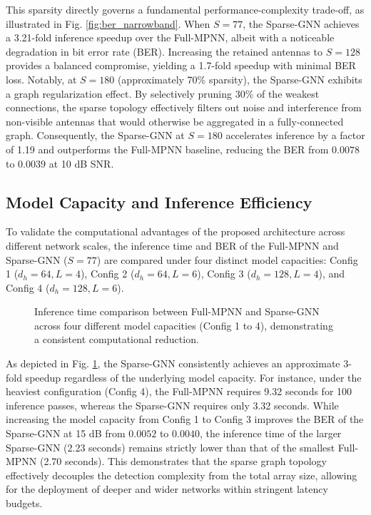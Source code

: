 This sparsity directly governs a fundamental performance-complexity trade-off, as illustrated in Fig. \ref{fig:ber_narrowband}. When $S=77$, the Sparse-GNN achieves a 3.21-fold inference speedup over the Full-MPNN, albeit with a noticeable degradation in bit error rate (BER). Increasing the retained antennas to $S=128$ provides a balanced compromise, yielding a 1.7-fold speedup with minimal BER loss. Notably, at $S=180$ (approximately 70\% sparsity), the Sparse-GNN exhibits a graph regularization effect. By selectively pruning 30\% of the weakest connections, the sparse topology effectively filters out noise and interference from non-visible antennas that would otherwise be aggregated in a fully-connected graph. Consequently, the Sparse-GNN at $S=180$ accelerates inference by a factor of 1.19 and outperforms the Full-MPNN baseline, reducing the BER from $0.0078$ to $0.0039$ at 10 dB SNR.

\subsection{Model Capacity and Inference Efficiency}
To validate the computational advantages of the proposed architecture across different network scales, the inference time and BER of the Full-MPNN and Sparse-GNN ($S=77$) are compared under four distinct model capacities: Config 1 ($d_h=64, L=4$), Config 2 ($d_h=64, L=6$), Config 3 ($d_h=128, L=4$), and Config 4 ($d_h=128, L=6$). 

\begin{figure}[t]
\centering

\caption{Inference time comparison between Full-MPNN and Sparse-GNN across four different model capacities (Config 1 to 4), demonstrating a consistent computational reduction.}
\label{fig:complexity}
\end{figure}

As depicted in Fig. \ref{fig:complexity}, the Sparse-GNN consistently achieves an approximate 3-fold speedup regardless of the underlying model capacity. For instance, under the heaviest configuration (Config 4), the Full-MPNN requires 9.32 seconds for 100 inference passes, whereas the Sparse-GNN requires only 3.32 seconds. While increasing the model capacity from Config 1 to Config 3 improves the BER of the Sparse-GNN at 15 dB from $0.0052$ to $0.0040$, the inference time of the larger Sparse-GNN (2.23 seconds) remains strictly lower than that of the smallest Full-MPNN (2.70 seconds). This demonstrates that the sparse graph topology effectively decouples the detection complexity from the total array size, allowing for the deployment of deeper and wider networks within stringent latency budgets.

